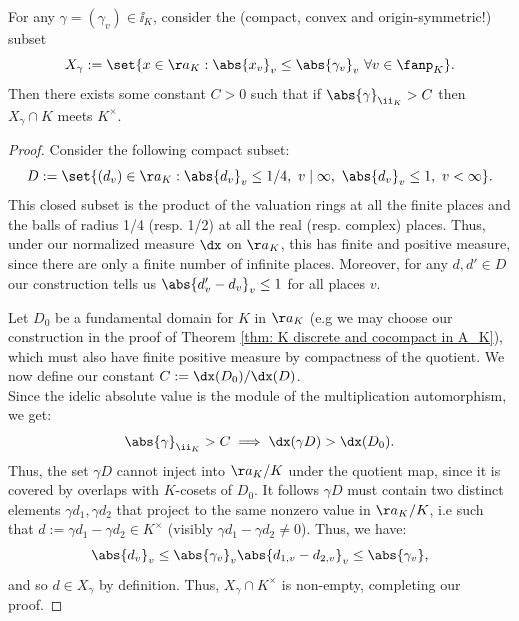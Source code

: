 \documentclass[11pt, x11names, openany]{book}
\begin{document}
\begin{lemma}
\label{lemma: adelic blichfeldt-minkowski}
For any $\gamma = (\gamma_v) \in \ii_K$, consider the (compact, convex and origin-symmetric!) subset 
\begin{equation*}
    X_\gamma := \set{x \in \aa_K : \abs{x_v}_v \leq \abs{\gamma_v}_v \ \forall v \in \fanp_K}.
\end{equation*}
Then there exists some constant $C > 0$ such that if $\abs{\gamma}_{\ii_K} > C$ then $X_\gamma \cap K$ meets $K^\times$. 
\end{lemma} 
\begin{proof}
Consider the following compact subset:
\begin{equation*}
    D := \set{(d_v) \in \aa_K : \abs{d_v}_v \leq 1/4, \ v \mid \infty, \ \abs{d_v}_v \leq 1, \ v < \infty }.
\end{equation*}
This closed subset is the product of the valuation rings at all the finite places and the balls of radius 1/4 (resp. 1/2) at all the real (resp. complex) places. Thus, under our normalized measure $\dx$ on $\aa_K$, this has finite and positive measure, since there are only a finite number of infinite places. Moreover, for any $d, d' \in D$ our construction tells us $\abs{d_v' - d_v}_v \leq 1$ for all places $v$.

Let $D_0$ be a fundamental domain for $K$ in $\aa_K$ (e.g we may choose our construction in the proof of Theorem \ref{thm: K discrete and cocompact in A_K}), which must also have finite positive measure by compactness of the quotient. We now define our constant $C := \dx(D_0)/\dx(D)$.\\
Since the idelic absolute value is the module of the multiplication automorphism, we get: 
\begin{equation*}
    \abs{\gamma}_{\ii_K} > C \implies \dx(\gamma D) > \dx(D_0).
\end{equation*}
Thus, the set $\gamma D$ cannot inject into $\aa_K/K$ under the quotient map, since it is covered by overlaps with $K$-cosets of $D_0$. It follows $\gamma D$ must contain two distinct elements $\gamma d_1, \gamma d_2$ that project to the same nonzero value in $\aa_K/K$, i.e such that $d := \gamma d_1 - \gamma d_2 \in K^\times$ (visibly $\gamma d_1 - \gamma d_2 \neq 0$). Thus, we have:
\begin{equation*}
    \abs{d_v}_v \leq \abs{\gamma_v}_{v} \abs{d_{1, v} - d_{2, v}}_v \leq \abs{\gamma_v},
\end{equation*}
and so $d \in X_\gamma$ by definition. Thus, $X_\gamma \cap K^\times$ is non-empty, completing our proof.
\end{proof}
\end{document}
